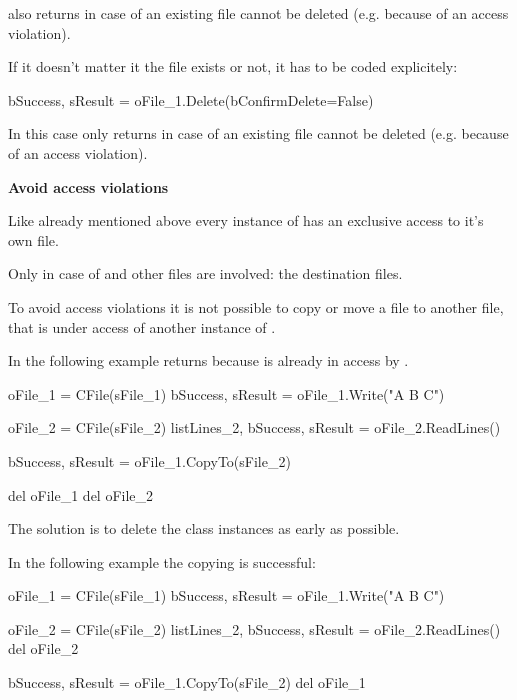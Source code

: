  also returns  in case of an existing file cannot be deleted (e.g. because of an access violation).

If it doesn't matter it the file exists or not, it has to be coded explicitely:

\begin{pythoncode}
bSuccess, sResult = oFile_1.Delete(bConfirmDelete=False)
\end{pythoncode}

In this case  only returns  in case of an existing file cannot be deleted (e.g. because of an access violation).

\textbf{Avoid access violations}

Like already mentioned above every instance of  has an exclusive access to it's own file.

Only in case of  and  other files are involved: the destination files.

To avoid access violations it is not possible to copy or move a file to another file, that is under access of another instance of .

In the following example  returns  because  is already in access by .

\begin{pythoncode}[linebackgroundcolor=\hlcode{7}]
oFile_1 = CFile(sFile_1)
bSuccess, sResult = oFile_1.Write("A B C")

oFile_2 = CFile(sFile_2)
listLines_2, bSuccess, sResult = oFile_2.ReadLines()

bSuccess, sResult = oFile_1.CopyTo(sFile_2)

del oFile_1
del oFile_2
\end{pythoncode}

The solution is to delete the class instances as early as possible.

In the following example the copying is successful:

\begin{pythoncode}[linebackgroundcolor=\hlcode{6}]
oFile_1 = CFile(sFile_1)
bSuccess, sResult = oFile_1.Write("A B C")

oFile_2 = CFile(sFile_2)
listLines_2, bSuccess, sResult = oFile_2.ReadLines()
del oFile_2

bSuccess, sResult = oFile_1.CopyTo(sFile_2)
del oFile_1
\end{pythoncode}

